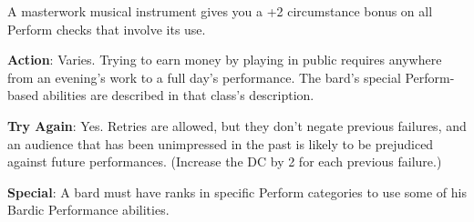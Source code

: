 A masterwork musical instrument gives you a +2 circumstance bonus on all Perform checks that involve its use.
				
\textbf{Action}: Varies. Trying to earn money by playing in public requires anywhere from an evening's work to a full day's performance. The bard's special Perform-based abilities are described in that class's description.
				
\textbf{Try Again}: Yes. Retries are allowed, but they don't negate previous failures, and an audience that has been unimpressed in the past is likely to be prejudiced against future performances. (Increase the DC by 2 for each previous failure.)
				
\textbf{Special}: A bard must have ranks in specific Perform categories to use some of his Bardic Performance abilities.
        	
